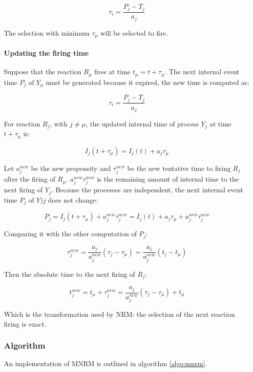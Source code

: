       $$\tau_i = \frac{P_j-T_j}{a_j}$$

      The selection with minimum $\tau_\mu$ will be selected to fire.

      \paragraph{Updating the firing time}
      Suppose that the reaction $R_\mu$ fires at time $t_\mu = t+\tau_\mu$.
      The next internal event time $P_j$ of $Y_\mu$ must be generated because it expired, the new time is computed as:

      $$\tau_i = \frac{P_j-T_j}{a_j}$$

      For reaction $R_j$, with $j\neq\mu$, the updated internal time of process $Y_j$ at time $t+\tau_\mu$ is:

      $$I_j(t+\tau_\mu) = I_j(t) + a_j\tau_\mu$$

      Let $a_j^{new}$ be the new propensity and $\tau_j^{new}$ be the new tentative time to firing $R_j$ after the firing of $R_\mu$.
      $a_j^{new}\tau_j^{new}$ is the remaining amount of internal time to the next firing of $Y_j$.
      Because the processes are independent, the next internal event time $P_j$ of $Y)j$ does not change:

      $$P_j = I_j(t+\tau_\mu) + a_j^{new}\tau_j^{new} = I_j(t) + a_j\tau_\mu + a_j^{new}\tau_j^{new}$$

      Comparing it with the other computation of $P_j$:

      $$\tau_j^{new} = \frac{a_j}{a_j^{new}}(\tau_j-\tau_\mu) = \frac{a_j}{a_j^{new}}(t_j-t_\mu)$$

      Then the absolute time to the next firing of $R_j$:

      $$t_j^{new} = t_\mu + \tau_j^{new} = \frac{a_j}{a_j^{new}}(\tau_j-\tau_\mu)+t_\mu$$

      Which is the transformation used by NRM: the selection of the next reaction firing is exact.

    \subsubsection{Algorithm}
    An implementation of MNRM is outlined in algorithm \ref{algo:mnrm}.

    

